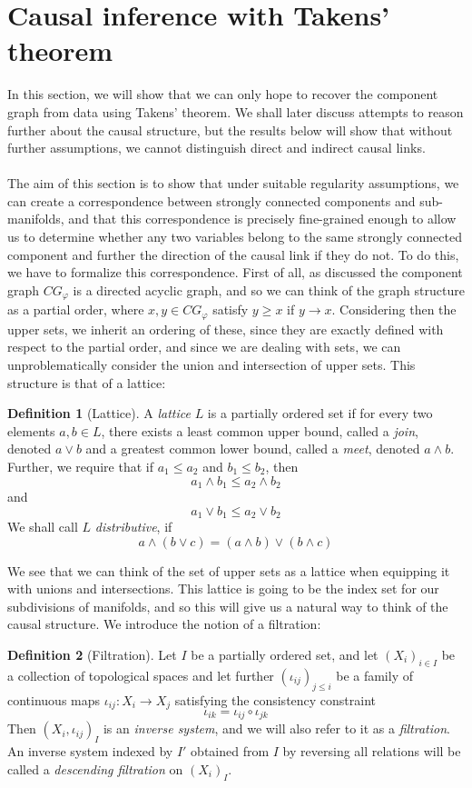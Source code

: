 \documentclass[11pt, a4paper]{memoir}
\theoremstyle{plain}
\theoremstyle{definition}
\newtheorem{defn}{Definition}
\begin{document}
\section{Causal inference with Takens' theorem}
In this section, we will show that we can only hope to recover the component graph from data using Takens' theorem. We shall later discuss attempts to reason further about the causal structure, but the results below will show that without further assumptions, we cannot distinguish direct and indirect causal links.\\\\
The aim of this section is to show that under suitable regularity assumptions, we can create a correspondence between strongly connected components and sub-manifolds, and that this correspondence is precisely fine-grained enough to allow us to determine whether any two variables belong to the same strongly connected component and further the direction of the causal link if they do not. To do this, we have to formalize this correspondence. First of all, as discussed the component graph $CG_\varphi$ is a directed acyclic graph, and so we can think of the graph structure as a partial order, where $x,y\in CG_\varphi$ satisfy $y\geq x$ if $y\to x$. Considering then the upper sets, we inherit an ordering of these, since they are exactly defined with respect to the partial order, and since we are dealing with sets, we can unproblematically consider the union and intersection of upper sets. This structure is that of a lattice: 
\begin{defn}[Lattice]
A \emph{lattice} $L$ is a partially ordered set if for every two elements $a,b\in L$, there exists a least common upper bound, called a \emph{join}, denoted $a \vee b$ and a greatest common lower bound, called a \emph{meet}, denoted $a\wedge b$. Further, we require that if $a_1\leq a_2$ and $b_1\leq b_2$, then
$$a_1\wedge b_1\leq a_2\wedge b_2$$
and
$$a_1\vee b_1\leq a_2\vee b_2$$
We shall call $L$ \emph{distributive}, if
$$a\wedge(b\vee c)=(a\wedge b)\vee (b\wedge c)$$
\end{defn}
We see that we can think of the set of upper sets as a lattice when equipping it with unions and intersections. This lattice is going to be the index set for our subdivisions of manifolds, and so this will give us a natural way to think of the causal structure. We introduce the notion of a filtration:
\begin{defn}[Filtration]
Let $I$ be a partially ordered set, and let $(X_i)_{i\in I}$ be a collection of topological spaces and let further $(\iota_{ij})_{j\leq i}$ be a family of continuous maps $\iota_{ij}: X_i\to X_j$ satisfying the consistency constraint
$$\iota_{ik}=\iota_{ij}\circ \iota_{jk}$$
Then $(X_i,\iota_{ij})_I$ is an \emph{inverse system}, and we will also refer to it as a \emph{filtration}. An inverse system indexed by $I'$ obtained from $I$ by reversing all relations will be called a \emph{descending filtration} on $(X_i)_I$.
\end{defn}
\end{document}
